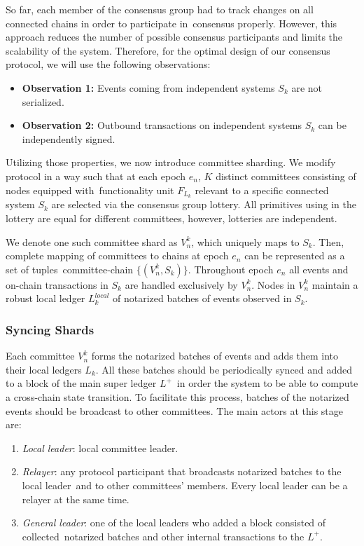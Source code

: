 So far, each member of the consensus group had to track changes on all connected chains in order to participate in\
consensus properly.
However, this approach reduces the number of possible consensus participants and limits the scalability of the system.
Therefore, for the optimal design of our consensus protocol, we will use the following observations:
\begin{itemize}
    \item[]\textbf{Observation 1:} Events coming from independent systems $S_k$ are not serialized.
    \item[] \textbf{Observation 2:} Outbound transactions on independent systems $S_k$ can be independently signed.
\end{itemize}

Utilizing those properties, we now introduce committee sharding.
We modify protocol in a way such that at each epoch $e_n$, $K$ distinct committees consisting of nodes equipped with\
functionality unit $F_{L_k}$ relevant to a specific connected system $S_k$ are selected via the consensus group lottery.
All primitives using in the lottery are equal for different committees, however, lotteries are independent.

We denote one such committee shard as $V_n^k$, which uniquely maps to $S_k$.
Then, complete mapping of committees to chains at epoch $e_n$ can be represented as a set of tuples\
committee-chain $\{(V_n^k, S_k)\}$.
Throughout epoch $e_n$ all events and on-chain transactions in $S_k$ are handled exclusively by $V_n^k$.
Nodes in $V_n^k$ maintain a robust local ledger $L^{local}_k$ of notarized batches of events observed in $S_k$.

\subsubsection{Syncing Shards}

Each committee $V_n^k$ forms the notarized batches of events and adds them into their local ledgers $L_k$.
All these batches should be periodically synced and added to a block of the main super ledger $L^+$\
in order the system to be able to compute a cross-chain state transition.
To facilitate this process, batches of the notarized events should be broadcast to other committees.
The main actors at this stage are:
\begin{enumerate}
    \item \emph{Local leader}: local committee leader.
    \item \emph{Relayer}: any protocol participant that broadcasts notarized batches to the local leader\
    and to other committees' members.
    Every local leader can be a relayer at the same time.
    \item \emph{General leader}: one of the local leaders who added a block consisted of collected\
    notarized batches and other internal transactions to the $L^+$.
\end{enumerate}

